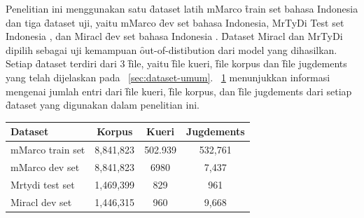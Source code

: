 Penelitian ini menggunakan satu \f{dataset} latih mMarco \f{train set} bahasa Indonesia \citep{mmarco} dan tiga \f{dataset} uji, yaitu mMarco \f{dev set} bahasa Indonesia, MrTyDi Test set Indonesia \citep{mrtydi}, dan Miracl \f{dev set} bahasa Indonesia \citep{miracl}. \f{Dataset} Miracl dan MrTyDi dipilih sebagai uji kemampuan \f{out-of-distibution} dari model yang dihasilkan. Setiap \f{dataset} terdiri dari 3 \f{file}, yaitu \f{file} kueri, \f{file} korpus dan \f{file jugdements} yang telah dijelaskan pada \sect~\ref{sec:dataset-umum}. \tab~\ref{tab:dataset-info} menunjukkan informasi mengenai jumlah entri dari \f{file} kueri, \f{file korpus}, dan \f{file jugdements} dari setiap \f{dataset} yang digunakan dalam penelitian ini.
\begin{table}
    \centering
    \label{tab:dataset-info}
    \begin{tabular}{|l|c|c|c|} \hline
        \textbf{Dataset} & \textbf{Korpus} & \textbf{Kueri} & \textbf{Jugdements} \\ \hline
        mMarco train set & 8,841,823       & 502.939        & 532,761             \\ \hline
        mMarco dev set   & 8,841,823       & 6980           & 7,437               \\ \hline
        Mrtydi test set  & 1,469,399       & 829            & 961                 \\ \hline
        Miracl dev set   & 1,446,315       & 960            & 9,668               \\ \hline
    \end{tabular}
\end{table}

